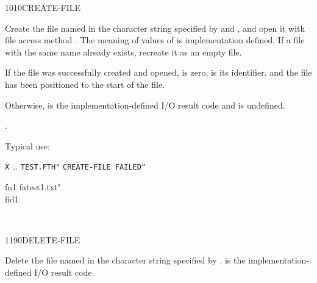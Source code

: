 \vspace*{-2ex}
\begin{worddef}{1010}{CREATE-FILE}
\item {}

	Create the file named in the character string specified by
	 and , and open it with file access method
	. The meaning of values of  is
	implementation defined. If a file with the same name already
	exists, recreate it as an empty file.

	If the file was successfully created and opened,  is
	zero,  is its identifier, and the file has been
	positioned to the start of the file.

	Otherwise,  is the implementation-defined I/O result
	code and  is undefined.

\see {}.

	\begin{rationale} %
		Typical use:

		\tab \word[core]{:} \texttt{X} {\ldots}
				 \texttt{TEST.FTH"} 
				 \texttt{CREATE-FILE FAILED"}
			\word[core]{;}
	\end{rationale}

	\begin{testing} %
		\ttfamily
		\word{:} fn1  fatest1.txt" \word{;} \\
		 fid1

		 \\
	\end{testing}
\end{worddef}

\vspace*{-2ex}
\begin{worddef}{1190}{DELETE-FILE}
\item {}

	Delete the file named in the character string specified by
	.  is the {im\-ple\-ment\-ation-de\-fin\-ed}
	I/O result code.

	\begin{testing} %
		 \\
		 \\
		\pagebreak
	\end{testing}
\end{worddef}


